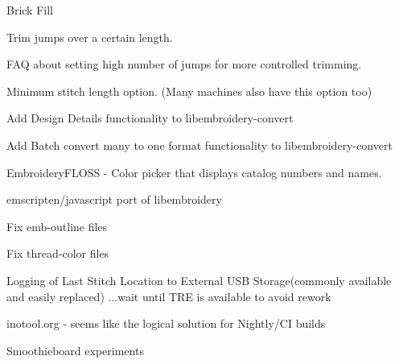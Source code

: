 \begin{DoxyRefList}
Brick Fill 



Trim jumps over a certain length. 



FAQ about setting high number of jumps for more controlled trimming. 



Minimum stitch length option. (Many machines also have this option too) 



Add \textquotesingle{}Design Details\textquotesingle{} functionality to libembroidery-\/convert 



Add \textquotesingle{}Batch convert many to one format\textquotesingle{} functionality to libembroidery-\/convert 



Embroidery\+FLOSS -\/ Color picker that displays catalog numbers and names. 



emscripten/javascript port of libembroidery

\label{todo__todo000009}%
%
Fix emb-\/outline files 



Fix thread-\/color files 



Logging of Last Stitch Location to External USB Storage(commonly available and easily replaced) ...wait until TRE is available to avoid rework 



inotool.\+org -\/ seems like the logical solution for Nightly/\+CI builds 



Smoothieboard experiments


\end{DoxyRefList}
